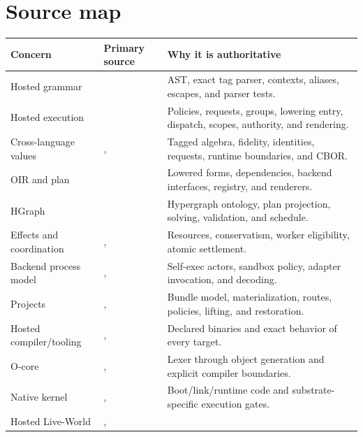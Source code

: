 \documentclass[11pt,oneside]{article}
\begin{document}
\section{Source map}

\begin{longtable}{P{0.27\textwidth} P{0.23\textwidth} P{0.42\textwidth}}
\toprule
\textbf{Concern} & \textbf{Primary source} & \textbf{Why it is authoritative} \\
\midrule
\endhead
Hosted grammar &
 &
AST, exact tag parser, contexts, aliases, escapes, and parser tests. \\
Hosted execution &
 &
Policies, requests, groups, lowering entry, dispatch, scopes, authority, and
rendering. \\
Cross-language values &
,
 &
Tagged algebra, fidelity, identities, requests, runtime boundaries, and CBOR. \\
OIR and plan &
 &
Lowered forms, dependencies, backend interfaces, registry, and renderers. \\
HGraph &
 &
Hypergraph ontology, plan projection, solving, validation, and schedule. \\
Effects and coordination &
,
 &
Resources, conservatism, worker eligibility, atomic settlement. \\
Backend process model &
,
 &
Self-exec actors, sandbox policy, adapter invocation, and decoding. \\
Projects &
,  &
Bundle model, materialization, routes, policies, lifting, and restoration. \\
Hosted compiler/tooling &
,  &
Declared binaries and exact behavior of every target. \\
O-core &
,  &
Lexer through object generation and explicit compiler boundaries. \\
Native kernel &
,  &
Boot/link/runtime code and substrate-specific execution gates. \\
Hosted Live-World &
,

\end{longtable}
\end{document}
